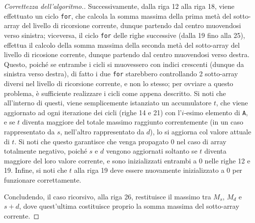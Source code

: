 \documentclass[a4paper, 12pt]{report}
\begin{document}
\begin{proof}[Correttezza dell'algoritmo.]
        Successivamente, dalla riga 12 alla riga 18, viene effettuato un ciclo \texttt{for}, che calcola la somma massima della prima metà del sotto-array del livello di ricorsione corrente, dunque partendo dal centro muovendosi verso sinistra; viceversa, il ciclo \texttt{for} delle righe successive (dalla 19 fino alla 25), effettua il calcolo della somma massima della seconda metà del sotto-array del livello di ricosione corrente, dunque partendo dal centro muovendosi verso destra. Questo, poiché se entrambe i cicli si muovessero con indici crescenti (dunque da sinistra verso destra), di fatto i due \texttt{for} starebbero controllando 2 sotto-array diversi nel livello di ricorsione corrente, e non lo stesso; per ovviare a questo problema, è sufficiente realizzare i cicli come appena descritto. Si noti che all'interno di questi, viene semplicemente istanziato un accumulatore $t$, che viene aggiornato ad ogni iterazione dei cicli (righe 14 e 21) con l'$i$-esimo elemento di \texttt{A}, e se $t$ diventa maggiore del totale massimo raggiunto correntemente (in un caso rappresentato da $s$, nell'altro rappresentato da $d$), lo si aggiorna col valore attuale di $t$. Si noti che questo garantisce che venga propagato 0 nel caso di array totalmente negativo, poiché $s$ e $d$ vengono aggiornati soltanto se $t$ diventa maggiore del loro valore corrente, e sono inizializzati entrambi a 0 nelle righe 12 e 19. Infine, si noti che $t$ alla riga 19 deve essere nuovamente inizializzato a 0 per funzionare correttamente.

        Concludendo, il caso ricorsivo, alla riga 26, restituisce il massimo tra $M_s$, $M_d$ e $s + d$, dove quest'ultima costituisce proprio la somma massima del sotto-array corrente.

    \end{proof}
\end{document}
